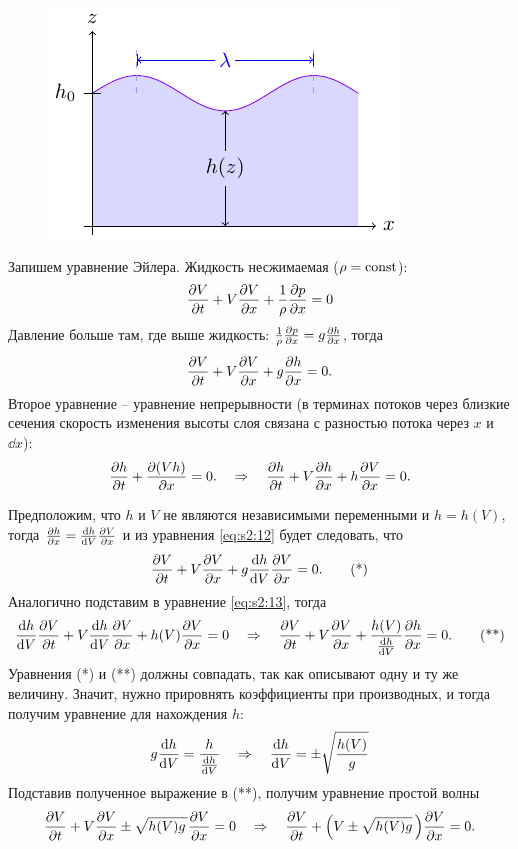 \begin{figure}[H]
	\centering
	\includegraphics[scale=1.5]{img/diffusion_instability/long_waves}
\end{figure}

Запишем уравнение Эйлера. Жидкость несжимаемая ($\rho=\textrm{const}$): 
\begin{gather*}
	\pdv{V}{t}+V\pdv{V}{x}+\frac1{\rho}\pdv{p}{x}=0
\end{gather*}
Давление больше там, где выше жидкость: $\frac1{\rho}\pdv{p}{x}=g\pdv{h}{x}$, тогда
\begin{equation}
	\pdv{V}{t}+V\pdv{V}{x}+g\pdv{h}{x}=0.
	\label{eq:s2:12}
\end{equation}
Второе уравнение -- уравнение непрерывности (в терминах потоков через близкие сечения скорость изменения высоты слоя связана с разностью потока через $x$ и $\dd x$):
\begin{equation}
	\pdv{h}{t}+\pdv{(Vh)}{x}=0. 
	\quad \Rightarrow \quad
	\pdv{h}{t}+V\pdv{h}{x}+h\pdv{V}{x}=0.
	\label{eq:s2:13}
\end{equation}

Предположим, что $h$ и $V$ не являются независимыми переменными и $h=h(V)$, тогда $\pdv{h}{x}=\dv{h}{V}\pdv{V}{x}$ и из уравнения \eqref{eq:s2:12} будет следовать, что 
\begin{gather*}
	\pdv{V}{t}+V\pdv{V}{x}+g\dv{h}{V}\pdv{V}{x} = 0.
	 \tag{*}
\end{gather*}
Аналогично подставим в уравнение \eqref{eq:s2:13}, тогда
\begin{gather*}
	\dv{h}{V}\pdv{V}{t}+V\dv{h}{V}\pdv{V}{x}+h(V)\pdv{V}{x} = 0
	\quad \Rightarrow \quad
	\pdv{V}{t}+V\pdv{V}{x}+\frac{h(V)}{\dv{h}{V}}\pdv{h}{x} = 0.
	\tag{**}
\end{gather*}
Уравнения (*) и (**) должны совпадать, так как описывают одну и ту же величину. Значит, нужно прировнять коэффициенты при производных, и тогда получим уравнение для нахождения $h$:
\begin{equation*}
	g\dv{h}{V}=\frac{h}{\dv{h}{V}}
	\quad \Rightarrow \quad
	\dv{h}{V}=\pm \sqrt{\frac{h(V)}{g}}
\end{equation*}
Подставив полученное выражение в (**), получим уравнение простой волны
\begin{equation}
	\pdv{V}{t}+V\pdv{V}{x}\pm \sqrt{h(V)g\,} \pdv{V}{x} = 0
	\quad \Rightarrow \quad
	\pdv{V}{t}+\qty(V\pm \sqrt{h(V)g}\,)\pdv{V}{x} = 0.
	\label{eq:s2:14}
\end{equation}

